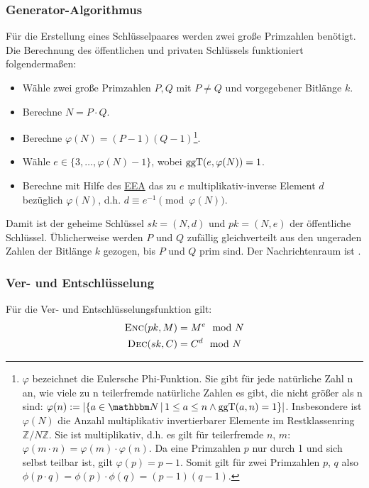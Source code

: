 \subsubsection{Generator-Algorithmus} Für die Erstellung eines
Schlüsselpaares werden zwei große Primzahlen benötigt. Die Berechnung
des öffentlichen und privaten Schlüssels funktioniert folgendermaßen:
\begin{itemize}
\item Wähle zwei große Primzahlen $P, Q$ mit $P \neq Q$ und
  vorgegebener Bitlänge $k$.
\item Berechne $N = P \cdot Q$.
\item Berechne $\varphi(N) = (P - 1)(Q - 1)$\footnote{$\varphi$
    bezeichnet die Eulersche Phi-Funktion\indexEulerPhiFunction. Sie gibt
    für jede natürliche Zahl n an, wie viele zu n teilerfremde natürliche
    Zahlen es gibt, die nicht größer als n sind: $\varphi(n) := \vert
    \{a\in\N \, |\, 1 \le a \le n \land \operatorname{ggT}(a,n) = 1 \}
    \vert$. Insbesondere ist $\varphi(N)$ die Anzahl multiplikativ
    invertierbarer Elemente im Restklassenring $\mathbb{Z}/N\mathbb{Z}$.
    Sie ist multiplikativ, d.h. es gilt für teilerfremde $n$, $m$:
    $\varphi(m\cdot n) = \varphi(m) \cdot \varphi(n)$. Da eine Primzahlen
    $p$ nur durch 1 und sich selbst teilbar ist, gilt $\varphi(p) =
    p-1$. Somit gilt für zwei Primzahlen $p$, $q$ also $\phi(p \cdot q) =
    \phi(p) \cdot \phi(q) = (p-1)(q-1)$.}.
\item Wähle $e \in \{3, \dotsc, \varphi(N) - 1\}$, wobei
  $\operatorname{ggT}(e, \varphi(N)) = 1$.
\item Berechne mit Hilfe des \hyperref[ssec:eea]{EEA} das zu $e$
  multiplikativ-inverse Element $d$ bezüglich $\varphi(N)$, d.h. $d \equiv
  e^{-1} \pmod{\varphi(N)}$.
\end{itemize}

Damit ist der geheime Schlüssel $sk = (N, d)$ und $pk = (N, e)$ der
öffentliche Schlüssel. Üblicherweise werden $P$ und $Q$ zufällig
gleichverteilt aus den ungeraden Zahlen der Bitlänge $k$ gezogen, bis
$P$ und $Q$ prim sind. Der Nachrichtenraum ist .
\subsubsection{Ver- und Entschlüsselung} Für die Ver- und
Entschlüsselungsfunktion gilt:
\begin{align*} \textsc{Enc}(pk, M) & = M^e \mod N \\ \textsc{Dec}(sk, C) & = C^d \mod N
\end{align*}

